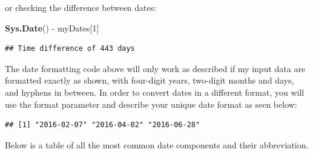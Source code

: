 \documentclass[]{book}
\newenvironment{Shaded}{\begin{snugshade}}{\end{snugshade}}
\newcommand{\KeywordTok}[1]{\textcolor[rgb]{0.13,0.29,0.53}{\textbf{{#1}}}}
\newcommand{\DataTypeTok}[1]{\textcolor[rgb]{0.13,0.29,0.53}{{#1}}}
\newcommand{\DecValTok}[1]{\textcolor[rgb]{0.00,0.00,0.81}{{#1}}}
\newcommand{\StringTok}[1]{\textcolor[rgb]{0.31,0.60,0.02}{{#1}}}
\newcommand{\CommentTok}[1]{\textcolor[rgb]{0.56,0.35,0.01}{\textit{{#1}}}}
\newcommand{\NormalTok}[1]{{#1}}
\begin{document}
or checking the difference between dates:

\begin{Shaded}
\begin{Highlighting}[]
\KeywordTok{Sys.Date}\NormalTok{() -}\StringTok{ }\NormalTok{myDates[}\DecValTok{1}\NormalTok{]}
\end{Highlighting}
\end{Shaded}

\begin{verbatim}
## Time difference of 443 days
\end{verbatim}

The date formatting code above will only work as described if my input
data are formatted exactly as shown, with four-digit years, two-digit
months and days, and hyphens in between. In order to convert dates in a
different format, you will use the format parameter and describe your
unique date format as seen below:

\begin{Shaded}
\end{Shaded}

\begin{verbatim}
## [1] "2016-02-07" "2016-04-02" "2016-06-28"
\end{verbatim}

Below is a table of all the most common date components and their
abbreviation.
\end{document}

